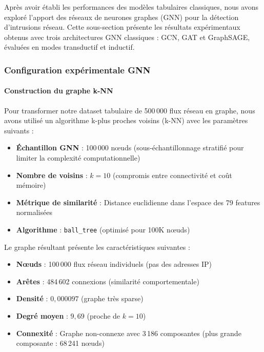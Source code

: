 ﻿\documentclass[11pt,a4paper]{article}
\begin{document}
Après avoir établi les performances des modèles tabulaires classiques, nous avons exploré l'apport des réseaux de neurones graphes (GNN) pour la détection d'intrusions réseau. Cette sous-section présente les résultats expérimentaux obtenus avec trois architectures GNN classiques : GCN, GAT et GraphSAGE, évaluées en modes transductif et inductif.

\subsubsection{Configuration expérimentale GNN}

\paragraph{Construction du graphe k-NN}

Pour transformer notre dataset tabulaire de 500\,000 flux réseau en graphe, nous avons utilisé un algorithme k-plus proches voisins (k-NN) avec les paramètres suivants :

\begin{itemize}
    \item \textbf{Échantillon GNN} : 100\,000 nœuds (sous-échantillonnage stratifié pour limiter la complexité computationnelle)
    \item \textbf{Nombre de voisins} : $k = 10$ (compromis entre connectivité et coût mémoire)
    \item \textbf{Métrique de similarité} : Distance euclidienne dans l'espace des 79 features normalisées
    \item \textbf{Algorithme} : \texttt{ball\_tree} (optimisé pour 100K nœuds)
\end{itemize}

Le graphe résultant présente les caractéristiques suivantes :
\begin{itemize}
    \item \textbf{Nœuds} : 100\,000 flux réseau individuels (pas des adresses IP)
    \item \textbf{Arêtes} : 484\,602 connexions (similarité comportementale)
    \item \textbf{Densité} : $0{,}000097$ (graphe très sparse)
    \item \textbf{Degré moyen} : $9{,}69$ (proche de $k=10$)
    \item \textbf{Connexité} : Graphe non-connexe avec 3\,186 composantes (plus grande composante : 68\,241 nœuds)
\end{itemize}
\end{document}
